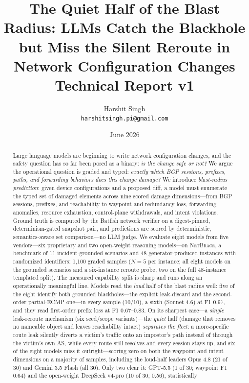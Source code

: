 \documentclass[11pt]{article}
\title{\textbf{The Quiet Half of the Blast Radius: LLMs Catch the Blackhole
but Miss the Silent Reroute in Network Configuration Changes}\\[0.5em]
\large Technical Report v1}
\author{Harshit Singh\\
\texttt{harshitsingh.pi@gmail.com}}
\date{June 2026}
\newcommand{\netbrace}{\textsc{NetBrace}}
\begin{document}
\maketitle

\begin{abstract}
Large language models are beginning to write network configuration changes,
and the safety question has so far been posed as a binary: \emph{is the change
safe or not?} We argue the operational question is graded and typed:
\emph{exactly which BGP sessions, prefixes, paths, and forwarding behaviors
does this change damage?} We introduce \emph{blast-radius prediction}: given
device configurations and a proposed diff, a model must enumerate the typed
set of damaged elements across nine scored damage dimensions---from BGP
sessions, prefixes, and reachability to waypoint and redundancy loss,
forwarding anomalies, resource exhaustion, control-plane withdrawals, and
intent violations. Ground truth is computed by the Batfish network verifier
on a digest-pinned, determinism-gated snapshot pair, and predictions are
scored by deterministic, semantics-aware set comparison---no LLM judge. We
evaluate eight models from five vendors---six proprietary and two
open-weight reasoning models---on \netbrace{}, a benchmark of 11
incident-grounded scenarios and 48 generator-produced instances with
randomized identifiers: 1{,}100 graded samples ($N{=}5$ per instance; all
eight models on the grounded scenarios and a six-instance reroute probe, two
on the full 48-instance templated split). The
measured capability split is sharp and runs along an operationally
meaningful line. Models read the \emph{loud} half of the blast radius well:
five of the eight identify both grounded blackholes---the explicit
leak-discard and the second-order partial-ECMP one---in every sample (10/10),
a sixth (Sonnet 4.6) at F1 0.97, and they read first-order prefix loss at F1
0.67--0.83. On its sharpest case---a \emph{single} leak-reroute mechanism
(six seed/scope variants)---the \emph{quiet} half (damage that removes no
nameable object and leaves reachability intact) \emph{separates the fleet}: a
more-specific route leak silently diverts a victim's traffic onto an
impostor's path instead of through the victim's own AS, while every route
still resolves and every session stays up, and six of the eight models miss
it outright---scoring zero on both the waypoint and intent dimensions on a
majority of samples, including the loud-half leaders Opus 4.8 (21 of 30) and
Gemini 3.5 Flash (all 30). Only two clear it: GPT-5.5 (1 of 30; waypoint F1
0.64) and the open-weight DeepSeek v4-pro (10 of 30; 0.56), statistically

\end{abstract}
\end{document}
